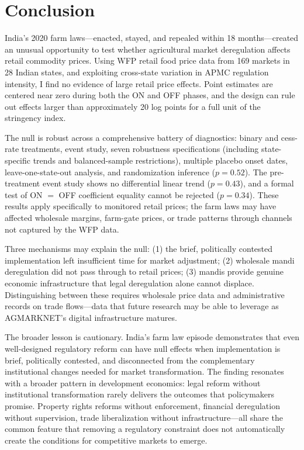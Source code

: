 \documentclass[12pt]{article}
\begin{document}
\section{Conclusion}

India's 2020 farm laws---enacted, stayed, and repealed within 18 months---created an unusual opportunity to test whether agricultural market deregulation affects retail commodity prices. Using WFP retail food price data from 169 markets in 28 Indian states, and exploiting cross-state variation in APMC regulation intensity, I find no evidence of large retail price effects. Point estimates are centered near zero during both the ON and OFF phases, and the design can rule out effects larger than approximately 20 log points for a full unit of the stringency index.

The null is robust across a comprehensive battery of diagnostics: binary and cess-rate treatments, event study, seven robustness specifications (including state-specific trends and balanced-sample restrictions), multiple placebo onset dates, leave-one-state-out analysis, and randomization inference ($p = 0.52$). The pre-treatment event study shows no differential linear trend ($p = 0.43$), and a formal test of ON $=$ OFF coefficient equality cannot be rejected ($p = 0.34$). These results apply specifically to monitored retail prices; the farm laws may have affected wholesale margins, farm-gate prices, or trade patterns through channels not captured by the WFP data.

Three mechanisms may explain the null: (1) the brief, politically contested implementation left insufficient time for market adjustment; (2) wholesale mandi deregulation did not pass through to retail prices; (3) mandis provide genuine economic infrastructure that legal deregulation alone cannot displace. Distinguishing between these requires wholesale price data and administrative records on trade flows---data that future research may be able to leverage as AGMARKNET's digital infrastructure matures.

The broader lesson is cautionary. India's farm law episode demonstrates that even well-designed regulatory reform can have null effects when implementation is brief, politically contested, and disconnected from the complementary institutional changes needed for market transformation. The finding resonates with a broader pattern in development economics: legal reform without institutional transformation rarely delivers the outcomes that policymakers promise. Property rights reforms without enforcement, financial deregulation without supervision, trade liberalization without infrastructure---all share the common feature that removing a regulatory constraint does not automatically create the conditions for competitive markets to emerge.
\end{document}
